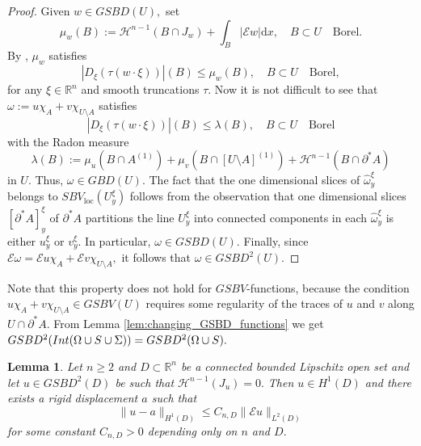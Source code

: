 \documentclass[reqno]{amsart}
\numberwithin{equation}{section}
\theoremstyle{plain}
\newtheorem{lemma}[theorem]{Lemma}
\theoremstyle{definition}
\newcommand{\R}{\mathbb{R}}
\newcommand{\cH}{\mathcal{H}}
\newcommand{\p}{\partial}
\renewcommand{\d}{\mathrm{d}}
\renewcommand{\hat}{\widehat}
\newcommand{\loc}{\mathrm{loc}}
\newcommand{\str}[1]{\mathcal{E}#1}
\newcommand{\substrate}{S}
\newcommand{\Ins}[1]{{\rm Int}{(#1\cup \substrate\cup \Sigma)}}
\begin{document}
\begin{proof}
Given $w\in GSBD(U),$ set
$$
\mu_w(B):= \cH^{n-1}(B\cap J_w) + \int_{B} |\str{w}|\d x,\quad B\subset U\quad\text{Borel}.
$$
By \cite[Remark 9.3]{D:2013_jems}, $\mu_w$ satisfies
$$
|D_\xi (\tau(w\cdot \xi))|(B) \le \mu_w(B),\quad B\subset U\quad \text{Borel},
$$
for any $\xi\in\R^n$ and smooth truncations $\tau.$ Now it is not difficult to see that $\omega:=u\chi_A+v\chi_{U\setminus A}$ satisfies
$$
|D_\xi (\tau(w\cdot \xi))|(B) \le \lambda(B),\quad B\subset U\quad\text{Borel}
$$
with the Radon measure
$$
\lambda(B):=\mu_u(B\cap A^{(1)}) + \mu_v(B\cap [U\setminus A]^{(1)})
+\cH^{n-1}(B\cap \p^*A)
$$
in $U.$ Thus, $\omega\in GBD(U).$
The fact that the one dimensional slices of $\hat\omega_y^\xi$ belongs to $SBV_\loc(U_y^\xi)$ follows from the observation that one dimensional slices $[\p^*A]_y^\xi$ of $\p^*A$ partitions the line  $U_y^\xi$ into connected components in each $\hat\omega_y^\xi$ is either $u_y^\xi$ or $v_y^\xi.$ In particular, $\omega\in GSBD(U).$ Finally,
since
$\str{\omega} = \str{u}\chi_A + \str{v}\chi_{U\setminus A},$ it follows that $\omega \in GSBD^2(U).$
\end{proof}

Note that this property does not hold for $GSBV$-functions, because the condition $u\chi_A + v\chi_{U\setminus A}\in GSBV(U)$ requires some regularity of the traces of   $u$ and $v$ along $U\cap \p^*A.$ From Lemma \ref{lem:changing_GSBD_functions} we get 
$
GSBD^2(\Ins{\Omega}) = GSBD^2(\Omega\cup S).
$

\begin{lemma}\label{lem:gsbd_is_sobolev}
Let $n\ge2$ and $D\subset\R^n$ be a connected bounded Lipschitz open set and let $u\in GSBD^2(D)$ be such that $\cH^{n-1}(J_u)=0.$ Then $u\in H^1(D)$ and there exists a rigid displacement $a$ such that 
\begin{equation*}
\|u-a\|_{H^1(D)} \le C_{n,D} \|\str{u}\|_{L^2(D)} 
\end{equation*} 
for some constant $C_{n,D}>0$ depending only on $n$ and $D.$
\end{lemma}
\end{document}
